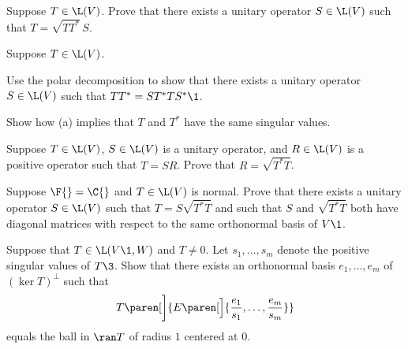 \exercise
Suppose $T \in \L(V)$. Prove that there exists a unitary operator $S \in \L(V)$ such that
$
T = \sqrt{TT^*}\, S$.


\exercise
Suppose $T \in \L(V)$.
\begin{subtheorem}
\item
Use the polar decomposition to show that there exists a unitary operator $S \in \L(V)$ such that
$TT^* = ST^*TS^*\1$.
\item
Show how (a) implies that $T$ and $T^*$ have the same singular values.
\end{subtheorem}
\exercisesubtheoremend


\exercise
Suppose $T \in \L(V)$, $S \in \L(V)$ is a unitary operator,
and $R \in \L(V)$ is a  positive operator such that $T = SR$.  Prove that
$R = \sqrt{T^* T}$.


\exercise
Suppose $\F{} = \C{}$ and $T \in \L(V)$ is normal. Prove that there exists a unitary operator $S \in \L(V)$ such that $T = S \sqrt{T^*T}$ and such that $S$ and $\sqrt{T^*T}$ both have diagonal matrices with respect to the same orthonormal basis of $V\1$. \label{8PolarNor}


\exercise
Suppose that $T \in \L(V\1,W)$ and $T \ne 0$. Let $s_1, \ldots, s_m$ denote the positive singular values of $T\3$. Show that there exists an orthonormal basis $e_1, \ldots, e_m$ of $(\ker T)^\perp$ such that
\[
T\paren[\bigg]{ E\paren[\Big]{ \frac{e_1}{s_1}, \ldots, \frac{e_m}{s_m} } }
\]
equals the ball in $\ran T$ of radius $1$ centered at $0$.


